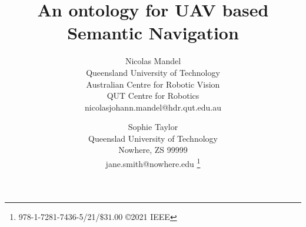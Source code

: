 \documentclass[twocolumn,letterpaper]{IEEEAerospaceCLS}  %
\begin{document}
\title{An ontology for UAV based  Semantic Navigation}

\author{%
Nicolas Mandel\\ 
Queensland University of Technology\\
Australian Centre for Robotic Vision\\
QUT Centre for Robotics\\
nicolasjohann.mandel@hdr.qut.edu.au
\and 
Sophie Taylor\\
Queenslad University of Technology\\
Nowhere, ZS 99999\\
jane.smith@nowhere.edu
\thanks{\footnotesize 978-1-7281-7436-5/21/$\$31.00$ \copyright2021 IEEE}              %
}



\maketitle

\thispagestyle{plain}
\pagestyle{plain}



\maketitle

\thispagestyle{plain}
\pagestyle{plain}
\end{document}
